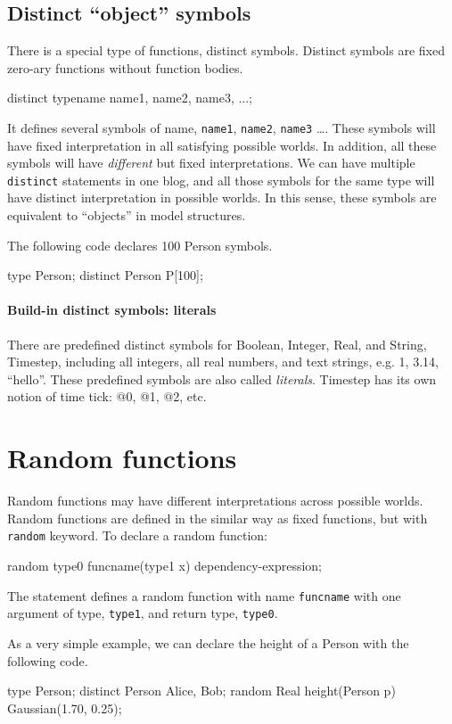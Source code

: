 \documentclass[12pt]{article}
\begin{document}
\subsection{Distinct ``object'' symbols}
There is a special type of functions, distinct symbols. 
Distinct symbols are fixed zero-ary functions without function bodies.
\begin{blogcode}
distinct typename name1, name2, name3, ...;
\end{blogcode}
It defines several symbols of name, \texttt{name1}, \texttt{name2}, \texttt{name3} \dots.
These symbols will have fixed interpretation in all satisfying possible worlds. In addition, all these symbols will have \emph{different} but fixed interpretations. 
We can have multiple \texttt{distinct} statements in one blog, and all those symbols for the same type will have 
distinct interpretation in possible worlds. In this sense, these symbols are equivalent to ``objects'' in model structures. 

The following \bl code declares 100 Person symbols.  
\begin{blogcode}
type Person;
distinct Person P[100];
\end{blogcode}


\paragraph{Build-in distinct symbols: literals}
There are predefined distinct symbols for Boolean, Integer,  Real, and String, Timestep, including all integers, all real numbers, and text strings, e.g. 1, 3.14, ``hello''. These predefined symbols are also called {\em literals}. Timestep has its own notion of time tick: @0, @1, @2, etc. 



\section{Random functions}
Random functions may have different interpretations across possible worlds. Random functions are defined in the similar way as fixed functions, but with \texttt{random} keyword.
To declare a random function:
\begin{blogcode}
random type0 funcname(type1 x) dependency-expression;
\end{blogcode}
The statement defines a random function with name \texttt{funcname} with one argument of type, \texttt{type1}, and return type, \texttt{type0}. 

As a very simple example, we can declare the height of a Person with the following code. 
\begin{blogcode}
type Person;
distinct Person Alice, Bob;
random Real height(Person p) ~ Gaussian(1.70, 0.25);
\end{blogcode}
\end{document}
